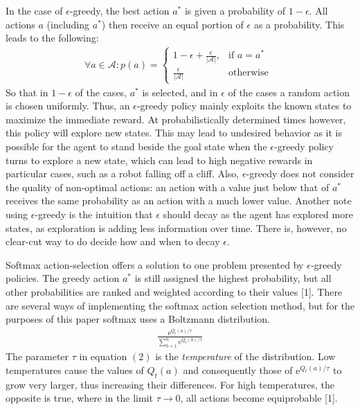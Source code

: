 \documentclass{article}
\begin{document}
In the case of $\epsilon$-greedy, the best action $a^*$ is given a probability of $1-\epsilon$. All actions $a$ (including $a^*$) then receive an equal portion of $\epsilon$ as a probability. This leads to the following:
\begin{align}
\forall a \in \mathcal{A}:p(a) = 
\begin{cases}
	1 - \epsilon + \frac{\epsilon}{|\mathcal{A}|}, & \text{if } a = a^*\\
	\frac{\epsilon}{|\mathcal{A}|} & \text{otherwise }
\end{cases}
\end{align}
So that in $1-\epsilon$ of the cases, $a^*$ is selected, and in $\epsilon$ of the cases a random action is chosen uniformly. Thus, an $\epsilon$-greedy policy mainly exploits the known states to maximize the immediate reward. At probabilistically determined times however, this policy will explore new states. This may lead to undesired behavior as it is possible for the agent to stand beside the goal state when the $\epsilon$-greedy policy turns to explore a new state, which can lead to high negative rewards in particular cases, such as a robot falling off a cliff. Also, $\epsilon$-greedy does not consider the quality of non-optimal actions: an action with a value just below that of $a^*$ receives the same probability as an action with a much lower value. Another note using $\epsilon$-greedy is the intuition that $\epsilon$ should decay as the agent has explored more states, as exploration is adding less information over time. There is, however, no clear-cut way to do decide how and when to decay $\epsilon$.

Softmax action-selection offers a solution to one problem presented by $\epsilon$-greedy policies. The greedy action $a^*$ is still assigned the highest probability, but all other probabilities are ranked and weighted according to their values [1]. There are several ways of implementing the softmax action selection method, but for the purposes of this paper softmax uses a Boltzmann distribution.
\begin{align}
\frac{\text{e}^{Q_t(a)/\tau}}{\sum^n_{b=1}\text{e}^{Q_t(b)/\tau}} 
\end{align}
The parameter $\tau$ in equation $(2)$ is the \textit{temperature} of the distribution. Low temperatures cause the values of $Q_t(a)$ and consequently those of e$^{Q_t(a)/\tau}$ to grow very larger, thus increasing their differences. For high temperatures, the opposite is true, where in the limit $\tau\rightarrow0$, all actions become equiprobable [1].
\end{document}
